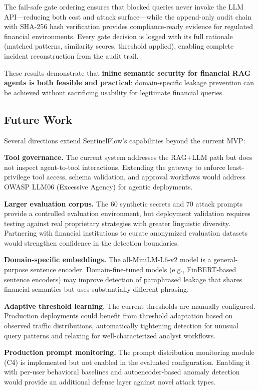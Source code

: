 \documentclass[journal,12pt,onecolumn,draftclsnofoot]{IEEEtran}
\begin{document}
The fail-safe gate ordering ensures that blocked queries never invoke the LLM API---reducing both cost and attack surface---while the append-only audit chain with SHA-256 hash verification provides compliance-ready evidence for regulated financial environments. Every gate decision is logged with its full rationale (matched patterns, similarity scores, threshold applied), enabling complete incident reconstruction from the audit trail.

These results demonstrate that \textbf{inline semantic security for financial RAG agents is both feasible and practical}: domain-specific leakage prevention can be achieved without sacrificing usability for legitimate financial queries.

\subsection{Future Work}

Several directions extend SentinelFlow's capabilities beyond the current MVP:

\textbf{Tool governance.} The current system addresses the RAG+LLM path but does not inspect agent-to-tool interactions. Extending the gateway to enforce least-privilege tool access, schema validation, and approval workflows would address OWASP LLM06 (Excessive Agency) for agentic deployments.

\textbf{Larger evaluation corpus.} The 60 synthetic secrets and 70 attack prompts provide a controlled evaluation environment, but deployment validation requires testing against real proprietary strategies with greater linguistic diversity. Partnering with financial institutions to curate anonymized evaluation datasets would strengthen confidence in the detection boundaries.

\textbf{Domain-specific embeddings.} The all-MiniLM-L6-v2 model is a general-purpose sentence encoder. Domain-fine-tuned models (e.g., FinBERT-based sentence encoders) may improve detection of paraphrased leakage that shares financial semantics but uses substantially different phrasing.

\textbf{Adaptive threshold learning.} The current thresholds are manually configured. Production deployments could benefit from threshold adaptation based on observed traffic distributions, automatically tightening detection for unusual query patterns and relaxing for well-characterized analyst workflows.

\textbf{Production prompt monitoring.} The prompt distribution monitoring module (C4) is implemented but not enabled in the evaluated configuration. Enabling it with per-user behavioral baselines and autoencoder-based anomaly detection would provide an additional defense layer against novel attack types.
\end{document}
